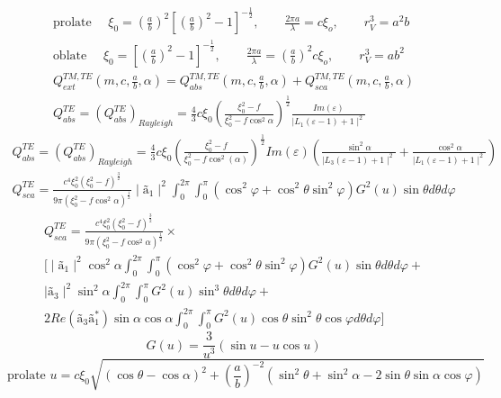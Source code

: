 \documentclass[a4paper,10pt]{article}
\begin{document}
\begin{align}
 \text{prolate  }\quad  \xi_0 = \left(\frac{a}{b}\right)^2\left[\left(\frac{a}{b}\right)^2-1\right]^{-\frac{1}{2}}, 
		 \qquad  \frac{2\pi a}{\lambda} = c\xi_o,
		 \qquad  r^3_V = a^2b \\
 \text{oblate  } \quad  \xi_0 = \left[\left(\frac{a}{b}\right)^2-1\right]^{-\frac{1}{2}}, 
		 \qquad  \frac{2\pi a}{\lambda} = \left(\frac{a}{b}\right)^2c\xi_o, 
		 \qquad  r^3_V = ab^2 \\
Q_{ext}^{TM,TE}\left(m,c,\frac{a}{b},\alpha\right) = Q_{abs}^{TM,TE}\left(m,c,\frac{a}{b},\alpha\right)+ Q_{sca}^{TM,TE}\left(m,c,\frac{a}{b},\alpha\right)\\
Q^{TE}_{abs} = \left(Q^{TE}_{abs}\right)_{Rayleigh} = \frac{4}{3}c\xi_0\left(\frac{\xi_0^2-f}{\xi_0^2-f\cos^2\alpha}\right)^\frac{1}{2}\frac{Im(\varepsilon)}{\mid L_1(\varepsilon-1)+1\mid^2}
\end{align}
\begin{align}
Q^{TE}_{abs} = \left(Q^{TE}_{abs}\right)_{Rayleigh} = \frac{4}{3}c\xi_0\left(\frac{\xi_0^2-f}{\xi_0^2-f\cos^2(\alpha)}\right)^\frac{1}{2}Im(\varepsilon)
\left(\frac{\sin^2\alpha}{\mid L_3(\varepsilon-1)+1\mid^2}+\frac{\cos^2\alpha}{\mid L_1(\varepsilon-1)+1\mid^2}\right)
\end{align}
\begin{align}
Q^{TE}_{sca} = \frac{c^4\xi_0^2(\xi_0^2-f)^\frac{3}{2}}{9\pi(\xi_0^2-f\cos^2\alpha)^\frac{1}{2}}\mid\text{\~{a}}_1\mid^2
	      \int^{2\pi}_0\int^{\pi}_0(\cos^2\varphi+\cos^2\theta\sin^2\varphi)G^2(u)\sin\theta d\theta d\varphi
\end{align}
\begin{eqnarray}
 Q^{TE}_{sca} = \frac{c^4\xi_0^2(\xi_0^2-f)^\frac{3}{2}}{9\pi(\xi_0^2-f\cos^2\alpha)^\frac{1}{2}}\times\nonumber\\
 \bigg[\mid\text{\~{a}}_1\mid^2\cos^2\alpha\int^{2\pi}_0\int^{\pi}_0(\cos^2\varphi+\cos^2\theta\sin^2\varphi)G^2(u)\sin\theta d\theta d\varphi+\nonumber\\
 \mid\text{\~{a}}_3\mid^2\sin^2\alpha\int^{2\pi}_0\int^{\pi}_0 G^2(u)\sin^3\theta d\theta d\varphi+\nonumber\\
  2Re(\text{\~{a}}_3\text{\~{a}}_1^*)\sin\alpha\cos\alpha\int^{2\pi}_0\int^{\pi}_0 G^2(u)\cos\theta\sin^2\theta\cos\varphi d\theta d\varphi\bigg]
\end{eqnarray}
\newpage
\begin{equation}
  G(u) = \frac{3}{u^3}(\sin u- u \cos u)
\end{equation}
\begin{equation}
  \text{prolate    } u=c\xi_0\sqrt{(\cos\theta-\cos\alpha)^2+\left(\frac{a}{b}\right)^{-2}(\sin^2\theta+\sin^2\alpha-2\sin\theta\sin\alpha\cos\varphi)} 
\end{equation}
\end{document}
